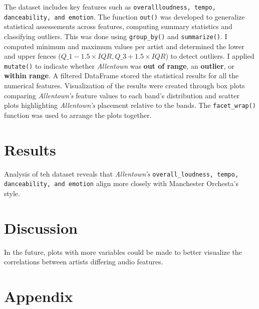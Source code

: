 \documentclass{article}\usepackage[]{graphicx}\usepackage[]{xcolor}
\begin{document}
\begin{multicols}{2}
The dataset includes key features such as \texttt{overall\textunderscore loudness, tempo, danceability, and emotion}. The function \texttt{out()} was developed to generalize statistical assessements across features, computing summary statistics and classifying outliers. This was done using \texttt{group\_by()} and \texttt{summarize()}. I computed minimum and maximum values per artist and determined the lower and upper fences ($Q\_1 - 1.5 \times IQR, Q\_3 + 1.5 \times IQR$) to detect outliers. I applied \texttt{mutate()} to indicate whether \textit{Allentown} was \textbf{out of range}, an \textbf{outlier}, or \textbf{within range}. A filtered DataFrame stored the statistical results for all the numerical features. Visualization of the results were created through box plots comparing \textit{Allentown's} feature values to each band's distribution and scatter plots highlighting \textit{Allentown's} placement relative to the bands. The \texttt{facet\_wrap()} function was used to arrange the plots together.


\section{Results}

Analysis of teh dataset reveals that \textit{Allentown's} \texttt{overall\_loudness, tempo, danceability, and emotion} align more closely with Manchester Orchesta's style.


\section{Discussion}

In the future, plots with more variables could be made to better visualize the correlations between artists differing audio features.

\vspace{2em}

\begin{tiny}

\end{tiny}
\end{multicols}

\newpage
\onecolumn
\section{Appendix}
\end{document}
